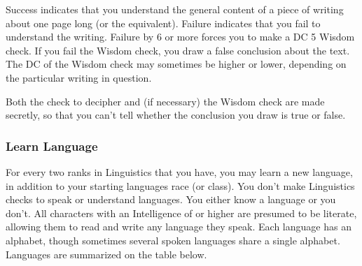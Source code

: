 Success indicates that you understand the general content of a piece of writing about one page long (or the equivalent). Failure indicates that you fail to understand the writing. Failure by 6 or more forces you to make a DC 5 Wisdom check. If you fail the Wisdom check, you draw a false conclusion about the text. The DC of the Wisdom check may sometimes be higher or lower, depending on the particular writing in question.

Both the check to decipher and (if necessary) the Wisdom check are made secretly, so that you can't tell whether the conclusion you draw is true or false.

\subsubsection{Learn Language}
For every two ranks in Linguistics that you have, you may learn a new language, in addition to your starting languages race (or class). You don't make Linguistics checks to speak or understand languages. You either know a language or you don't. All characters with an Intelligence of  or higher are presumed to be literate, allowing them to read and write any language they speak. Each language has an alphabet, though sometimes several spoken languages share a single alphabet. Languages are summarized on the table below.


